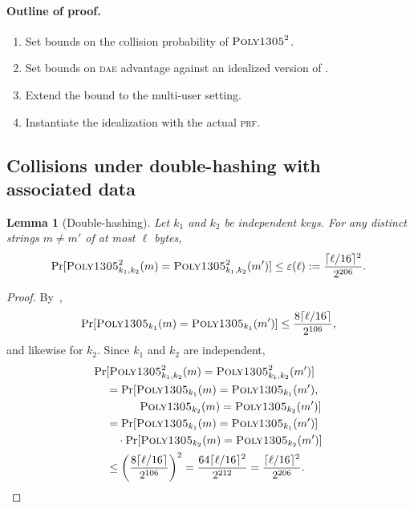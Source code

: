 \documentclass{article}
\newtheorem{lemma}{Lemma}
\def\operatorsc#1{{%
  \ifmmode\let\next=\operatorname\else\let\next=\relax\fi\next{\textsc{#1}}}}
\def\Poly#1/{\operatorsc{Poly#1}}
\def\DAENCE/{\operatorsc{Daence}}
\def\PRF{%
  \ifmmode\def\next{\operatorname{PRF}}%
    \else\def\next/{\textsc{prf}}%
  \fi\next}
\def\DAE{%
  \ifmmode\def\next{\operatorname{DAE}}%
    \else\def\next/{\textsc{dae}}%
  \fi\next}
\newcommand{\collisionbound}{\varepsilon}
\begin{document}
\paragraph*{Outline of proof.}

\begin{enumerate}
  \item Set bounds on the collision probability of $\Poly1305/^2$.
  \item Set bounds on \DAE/ advantage against an idealized version of
     \DAENCE/.
  \item Extend the bound to the multi-user setting.
  \item Instantiate the idealization with the actual \PRF/.
\end{enumerate}

\subsection{Collisions under double-hashing with associated data}

\begin{lemma}[Double-hashing]\label{double-hash}
  Let $k_1$ and $k_2$ be independent \Poly1305/ keys.
  For any distinct strings $m \ne m'$ of at most $\ell$ bytes,
  \[
    \Pr[\Poly1305/^2_{k_1,k_2}(m) = \Poly1305/^2_{k_1,k_2}(m')]
    \leq \collisionbound(\ell)
    := \frac{\lceil\ell/16\rceil^2}{2^{206}}.
  \]
\end{lemma}

\begin{proof}
  By~\cite[Theorem~3.3]{bernstein2005poly1305},
  \[
    \Pr[\Poly1305/_{k_1}(m) = \Poly1305/_{k_1}(m')]
    \leq \frac{8\lceil\ell/16\rceil}{2^{106}},
  \]
   and likewise for $k_2$.
  Since $k_1$ and $k_2$ are independent,
  \begin{align*}
    \Pr&[\Poly1305/^2_{k_1,k_2}(m) = \Poly1305/^2_{k_1,k_2}(m')] \\
    &= \Pr[\Poly1305/_{k_1}(m) = \Poly1305/_{k_1}(m'), \\
    &\qquad\quad\Poly1305/_{k_2}(m) = \Poly1305/_{k_2}(m')] \\
    &= \Pr[\Poly1305/_{k_1}(m) = \Poly1305/_{k_1}(m')] \\
    &\quad
       \cdot
       \Pr[\Poly1305/_{k_2}(m) = \Poly1305/_{k_2}(m')] \\
    &\leq \biggl(\frac{8\lceil\ell/16\rceil}{2^{106}}\biggr)^2
     = \frac{64\lceil\ell/16\rceil^2}{2^{212}}
     = \frac{\lceil\ell/16\rceil^2}{2^{206}}.
    \qedhere
  \end{align*}
\end{proof}
\end{document}
